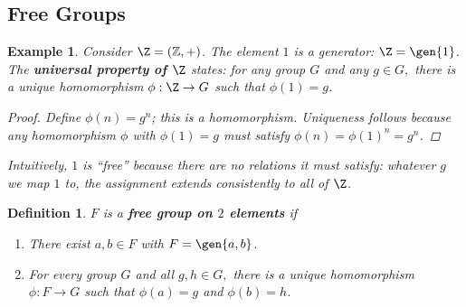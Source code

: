 \documentclass[a4paper,12pt]{article}
\newtheorem{defn}[thm]{Definition}
\newtheorem{eg}[thm]{Example}
\begin{document}
\subsection{Free Groups}
\begin{eg}
    Consider $\Z=(\mathbb{Z},+)$. The element $1$ is a generator: $\Z=\gen{1}$. The \textbf{universal property of $\Z$} states: for any group $G$ and any $g\in G,$ there is a unique homomorphism $\phi:\Z\to G$ such that $\phi(1)=g$. 
    \begin{proof}
        Define $\phi(n)=g^n$; this is a homomorphism. Uniqueness follows because any homomorphism $\phi$ with $\phi(1)=g$ must satisfy $\phi(n)=\phi(1)^n=g^n$. 
    \end{proof}
    \noindent Intuitively, $1$ is ``free'' because there are no relations it must satisfy: whatever $g$ we map $1$ to, the assignment extends consistently to all of $\Z$.
\end{eg}
\begin{defn}
    $F$ is a \textbf{free group on $2$ elements} if
    \begin{enumerate}
        \item There exist $a,b\in F$ with $F=\gen{a,b}$.
        \item For every group $G$ and all $g,h\in G,$ there is a unique homomorphism $\phi:F\to G$ such that $\phi(a)=g$ and $\phi(b)=h$. 
    \end{enumerate}
\end{defn}
\newpage
\end{document}
